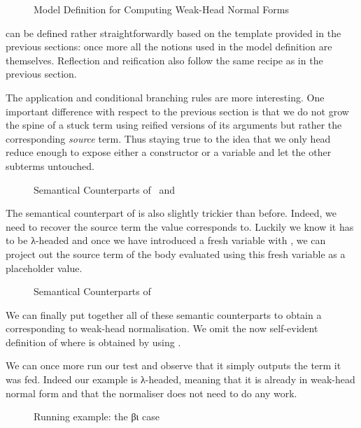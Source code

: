 \begin{figure}[h]
\caption{Model Definition for Computing Weak-Head Normal Forms\label{fig:betaiotamodel}}
\end{figure}

 can be defined rather straightforwardly based on the template
provided in the previous sections: once more all the notions used in the model
definition are  themselves. Reflection and reification also
follow the same recipe as in the previous section.

The application and conditional branching rules are more
interesting. One important difference with respect to the previous
section is that we do not grow the spine of a stuck term using
reified versions of its arguments but rather the corresponding
\emph{source} term. Thus staying true to the idea that we only head
reduce enough to expose either a constructor or a variable and let
the other subterms untouched.

\begin{figure}[h]
\caption{Semantical Counterparts of ~and \label{fig:betaiotaappifte}}
\end{figure}

The semantical counterpart of  is also slightly trickier than
before. Indeed, we need to recover the source term the value corresponds
to. Luckily we know it has to be λ-headed and once we have introduced a
fresh variable with , we can project out the source term of
the body evaluated using this fresh variable as a placeholder value.

\begin{figure}[h]
\caption{Semantical Counterparts of \label{fig:betaiotalam}}
\end{figure}

We can finally put together all of these semantic counterparts to
obtain a  corresponding to weak-head normalisation.
We omit the now self-evident definition of  where 
is obtained by using .

We can once more run our test and observe that it simply outputs the
term it was fed. Indeed our example is λ-headed, meaning that it is
already in weak-head normal form and that the normaliser does not need
to do any work.

\begin{figure}[h]
\caption{Running example: the βι case}\label{fig:betaiotatest}
\end{figure}
